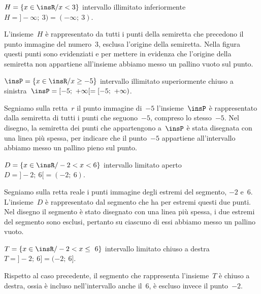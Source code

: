 \begin{exrig}
\begin{esempio}
$H=\{x\in \insR/x<3\}$ intervallo illimitato 
inferiormente~$H = ]-\infty;~3) = (-\infty;~3)$.

L'insieme~$H$ è rappresentato da tutti i punti della
semiretta che precedono il punto immagine del numero~3, esclusa
l'origine della semiretta. Nella figura questi punti sono evidenziati e 
per mettere in evidenza che l'origine della semiretta non
appartiene all'insieme abbiamo messo un pallino vuoto sul punto.
\begin{center}
 
\end{center}
\end{esempio}

\begin{esempio}
$\insP=\{x\in \insR/x\ge -5\}$ intervallo illimitato superiormente chiuso 
a sinistra~$\insP = [-5;~+\infty[ = [-5;~+\infty)$.

Segniamo sulla retta~$r$ il punto immagine di~$-5$
l'insieme~$\insP$ è rappresentato dalla semiretta di tutti
i punti che seguono~$-5$, compreso lo stesso~$-5$. Nel disegno, la
semiretta dei punti che appartengono a~$\insP$ è stata disegnata con una
linea più spessa, per indicare che il punto~$-5$ appartiene
all'intervallo abbiamo messo un pallino pieno sul punto.
\begin{center}
 
\end{center}
\end{esempio}

\begin{esempio}
 $D=\{x\in \insR/-2<x<6\}$ intervallo limitato 
 aperto~$D = ]-2;~6[ = (-2;~6)$.

Segniamo sulla retta reale i punti immagine degli estremi del segmento,
$-2$ e~6. L'insieme~$D$ è rappresentato dal segmento che
ha per estremi questi due punti. Nel disegno il segmento è stato
disegnato con una linea più spessa, i due estremi del segmento sono
esclusi, pertanto su ciascuno di essi abbiamo messo un pallino vuoto.
\begin{center}
 
\end{center}
\end{esempio}

\begin{esempio}
$T=\{x\in \insR/-2<x\le~6\}$ intervallo limitato chiuso a 
destra~$T = ]-2;~6] = (-2;~6]$.

Rispetto al caso precedente, il segmento che rappresenta
l'insieme~$T$ è chiuso a destra, ossia è incluso
nell'intervallo anche il~6, è escluso invece il
punto~$-2$.
\begin{center}
 
\end{center}
\end{esempio}


\end{exrig}
